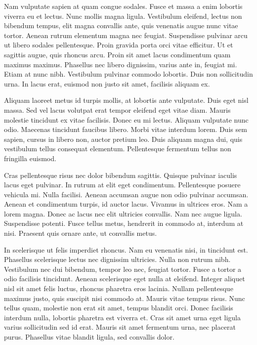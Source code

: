 Nam vulputate sapien at quam congue sodales. Fusce et massa a enim lobortis viverra eu et lectus. Nunc mollis magna ligula. Vestibulum eleifend, lectus non bibendum tempus, elit magna convallis ante, quis venenatis augue nunc vitae tortor. Aenean rutrum elementum magna nec feugiat. Suspendisse pulvinar arcu ut libero sodales pellentesque. Proin gravida porta orci vitae efficitur. Ut et sagittis augue, quis rhoncus arcu. Proin sit amet lacus condimentum quam maximus maximus. Phasellus nec libero dignissim, varius ante in, feugiat mi. Etiam at nunc nibh. Vestibulum pulvinar commodo lobortis. Duis non sollicitudin urna. In lacus erat, euismod non justo sit amet, facilisis aliquam ex.

Aliquam laoreet metus id turpis mollis, at lobortis ante vulputate. Duis eget nisl massa. Sed vel lacus volutpat erat tempor eleifend eget vitae diam. Mauris molestie tincidunt ex vitae facilisis. Donec eu mi lectus. Aliquam vulputate nunc odio. Maecenas tincidunt faucibus libero. Morbi vitae interdum lorem. Duis sem sapien, cursus in libero non, auctor pretium leo. Duis aliquam magna dui, quis vestibulum tellus consequat elementum. Pellentesque fermentum tellus non fringilla euismod.

Cras pellentesque risus nec dolor bibendum sagittis. Quisque pulvinar iaculis lacus eget pulvinar. In rutrum at elit eget condimentum. Pellentesque posuere vehicula mi. Nulla facilisi. Aenean accumsan augue non odio pulvinar accumsan. Aenean et condimentum turpis, id auctor lacus. Vivamus in ultrices eros. Nam a lorem magna. Donec ac lacus nec elit ultricies convallis. Nam nec augue ligula. Suspendisse potenti. Fusce tellus metus, hendrerit in commodo at, interdum at nisi. Praesent quis ornare ante, ut convallis metus.

In scelerisque ut felis imperdiet rhoncus. Nam eu venenatis nisi, in tincidunt est. Phasellus scelerisque lectus nec dignissim ultricies. Nulla non rutrum nibh. Vestibulum nec dui bibendum, tempor leo nec, feugiat tortor. Fusce a tortor a odio facilisis tincidunt. Aenean scelerisque eget nulla at eleifend. Integer aliquet nisl sit amet felis luctus, rhoncus pharetra eros lacinia. Nullam pellentesque maximus justo, quis suscipit nisi commodo at. Mauris vitae tempus risus. Nunc tellus quam, molestie non erat sit amet, tempus blandit orci. Donec facilisis interdum nulla, lobortis pharetra est viverra et. Cras sit amet urna eget ligula varius sollicitudin sed id erat. Mauris sit amet fermentum urna, nec placerat purus. Phasellus vitae blandit ligula, sed convallis dolor.

